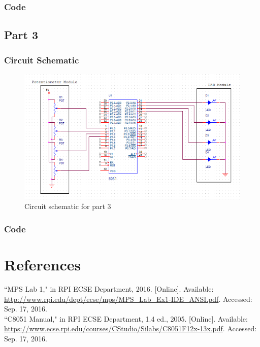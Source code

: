 \documentclass[12pt]{article}
\begin{document}
	\subsubsection{Code}
		

\subsection{Part 3}
	\subsubsection{Circuit Schematic}
		\begin{figure}[h]
			\includegraphics{schematic.png}
			\caption{Circuit schematic for part 3}
			\label{schematic}
		\end{figure} 
	\pagebreak
	\subsubsection{Code}
		
	
	
\section{References} 
\noindent
``MPS Lab 1," in RPI ECSE Department, 2016. [Online]. Available: \url{http://www.rpi.edu/dept/ecse/mps/MPS_Lab_Ex1-IDE_ANSI.pdf}. Accessed: Sep. 17, 2016.\\
\newline\noindent
``C8051 Manual," in RPI ECSE Department, 1.4 ed., 2005. [Online]. Available: \url{https://www.ecse.rpi.edu/courses/CStudio/Silabs/C8051F12x-13x.pdf}. Accessed: Sep. 17, 2016.
\end{document}

